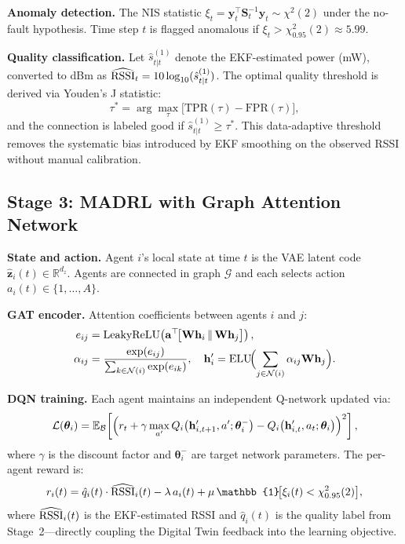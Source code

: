 \documentclass[conference]{IEEEtran}
\begin{document}
\textbf{Anomaly detection.}
The NIS statistic $\xi_t=\mathbf{y}_t^\top\mathbf{S}_t^{-1}\mathbf{y}_t
\sim\chi^2(2)$ under the no-fault hypothesis. Time step $t$ is flagged
anomalous if $\xi_t>\chi^2_{0.95}(2)\approx5.99$.

\textbf{Quality classification.}
Let $\hat{s}^{(1)}_{t|t}$ denote the EKF-estimated power (mW),
converted to dBm as
$\widehat{\rm RSSI}_{t} = 10\log_{10}(\hat{s}^{(1)}_{t|t})$.
The optimal quality threshold is derived via Youden's J statistic:
\begin{equation}
\tau^*=\arg\max_\tau\bigl[\mathrm{TPR}(\tau)-\mathrm{FPR}(\tau)\bigr],
\label{eq:youden}
\end{equation}
and the connection is labeled good if $\hat{s}^{(1)}_{t|t}\geq\tau^*$.
This data-adaptive threshold removes the systematic bias introduced by
EKF smoothing on the observed RSSI without manual calibration.

\subsection{Stage 3: MADRL with Graph Attention Network}

\textbf{State and action.}
Agent $i$'s local state at time $t$ is the VAE latent code
$\hat{\mathbf{z}}_i(t)\in\mathbb{R}^{d_z}$. Agents are connected in
graph $\mathcal{G}$ and each selects action $a_i(t)\in\{1,\ldots,A\}$.

\textbf{GAT encoder.}
Attention coefficients between agents $i$ and $j$:
\begin{align}
e_{ij}&=\mathrm{LeakyReLU}\!\left(\mathbf{a}^\top\!
  \bigl[\mathbf{W}\mathbf{h}_i\,\|\,\mathbf{W}\mathbf{h}_j\bigr]\right),
\label{eq:gat_e}\\
\alpha_{ij}&=\frac{\exp(e_{ij})}{\sum_{k\in\mathcal{N}(i)}\exp(e_{ik})},\quad
\mathbf{h}'_i=\mathrm{ELU}\!\Bigl(\sum_{j\in\mathcal{N}(i)}\alpha_{ij}\mathbf{W}\mathbf{h}_j\Bigr).
\label{eq:gat_h}
\end{align}

\textbf{DQN training.}
Each agent maintains an independent Q-network updated via:
\begin{equation}
\mathcal{L}(\bm{\theta}_i)=\mathbb{E}_{\mathcal{B}}\!\left[
  \Bigl(r_t+\gamma\max_{a'}Q_i\!\left(\mathbf{h}'_{i,t+1},a';\bm{\theta}_i^-\right)
  -Q_i\!\left(\mathbf{h}'_{i,t},a_t;\bm{\theta}_i\right)\Bigr)^2
\right],
\label{eq:dqn}
\end{equation}
where $\gamma$ is the discount factor and $\bm{\theta}_i^-$ are target
network parameters. The per-agent reward is:
\begin{equation}
r_i(t) = \hat{q}_i(t) \cdot \widehat{\rm RSSI}_i(t) - \lambda \, a_i(t) + \mu \, \mathbb{1}\!\bigl[ \xi_i(t) < \chi^2_{0.95}(2) \bigr],
\label{eq:reward}
\end{equation}
where $\widehat{\rm RSSI}_i(t)$ is the EKF-estimated RSSI and $\hat{q}_i(t)$
is the quality label from Stage~2---directly coupling the Digital Twin
feedback into the learning objective.
\end{document}
